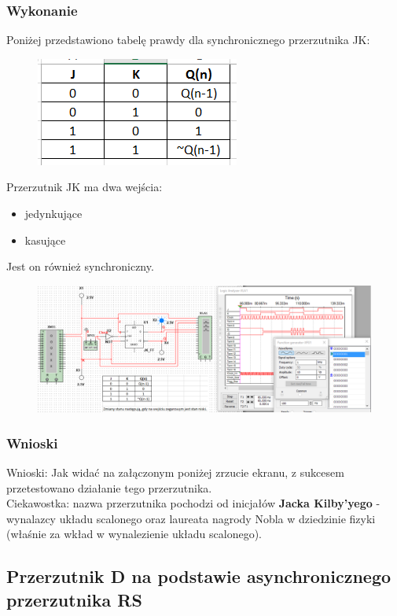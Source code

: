 \documentclass[12pt,a4paper]{article}
\begin{document}
\subsubsection{Wykonanie}
Poniżej przedstawiono tabelę prawdy dla synchronicznego przerzutnika JK:
\begin{figure}[H]
\centering
\includegraphics{img/3cTruthTable}
\end{figure}

Przerzutnik JK ma dwa wejścia:
\begin{itemize}
\item jedynkujące
\item kasujące
\end{itemize}
Jest on również synchroniczny. 

\begin{figure}[H]
\centering
\includegraphics[width=\textwidth]{img/3c_syncJK}
\end{figure}

\subsubsection{Wnioski}

Wnioski: Jak widać na załączonym poniżej zrzucie ekranu, z sukcesem przetestowano działanie tego przerzutnika. \\
Ciekawostka: nazwa przerzutnika pochodzi od inicjałów  \textbf{Jacka Kilby'yego} - wynalazcy układu scalonego oraz laureata nagrody Nobla w dziedzinie fizyki (właśnie za wkład w wynalezienie układu scalonego).


\subsection{Przerzutnik D na podstawie asynchronicznego przerzutnika RS}
\end{document}
